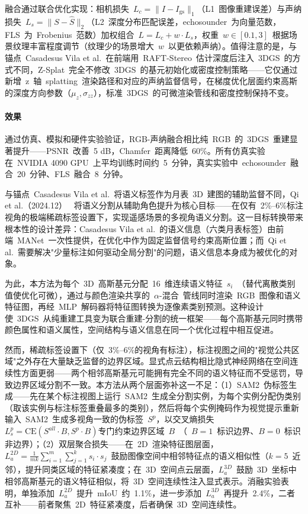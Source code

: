 融合通过联合优化实现：相机损失~$L_c = \|I - I_{\text{gs}}\|_1$（L1~图像重建误差）与声纳损失~$L_s = \|S - \hat{S}\|_2$（L2~深度分布匹配误差，echosounder~为向量范数，FLS~为~Frobenius~范数）加权组合~$L = L_c + w \cdot L_s$，权重~$w \in [0.1, 3]$~根据场景纹理丰富程度调节（纹理少的场景增大~$w$~以更依赖声纳）。值得注意的是，与锚点~Casadesus Vila et al.~在前端用~RAFT-Stereo~估计深度后注入~3DGS~的方式不同，Z-Splat~完全不修改~3DGS~的基元初始化或密度控制策略——它仅通过新增~z~轴~splatting~渲染路径和对应的声纳监督信号，在梯度优化层面约束高斯的深度方向参数（$\mu_z, \sigma_{zz}$），标准~3DGS~的可微渲染管线和密度控制保持不变。

\paragraph{效果}通过仿真、模拟和硬件实验验证，RGB-声纳融合相比纯~RGB~的~3DGS~重建显著提升——PSNR~改善~5 dB，Chamfer~距离降低~60\%。所有仿真实验在~NVIDIA 4090 GPU~上平均训练时间约~5~分钟，真实实验中~echosounder~融合~20~分钟、FLS~融合~8~分钟。

与锚点~Casadesus Vila et al.~将语义标签作为月表~3D~建图的辅助监督不同，Qi et al.（2024.12）~\cite{2412_05969} 将语义分割从辅助角色提升为核心目标——在仅有~2\%--6\%标注视角的极端稀疏标签设置下，实现遥感场景的多视角语义分割。这一目标转换带来根本性的设计差异：Casadesus Vila et al.~的语义信息（六类月表标签）由前端~MANet~一次性提供，在优化中作为固定监督信号约束高斯位置；而~Qi et al.~需要解决"少量标注如何驱动全局分割"的问题，语义信息本身成为被优化的对象。

为此，本方法为每个~3D~高斯基元分配~16~维连续语义特征~$s_i$~（替代离散类别值使优化可微），通过与颜色渲染共享的~$\alpha$-混合~管线同时渲染~RGB~图像和语义特征图，再经~MLP~解码器将特征图转换为逐像素类别预测。这种设计使~3DGS~从纯重建工具变为联合重建-分割的统一框架——每个高斯基元同时携带颜色属性和语义属性，空间结构与语义信息在同一个优化过程中相互促进。

然而，稀疏标签设置下（仅~3\%--6\%的视角有标注），标注视图之间的"视觉公共区域"之外存在大量缺乏监督的边界区域。显式点云结构相比隐式神经网络在空间连续性方面更弱——两个相邻高斯基元可能拥有完全不同的语义特征而不受惩罚，导致边界区域分割不一致。本方法从两个层面弥补这一不足：（1）SAM2~伪标签生成——先在某个标注视图上运行~SAM2~生成全分割实例，为每个实例分配伪类别（取该实例与标注标签重叠最多的类别），然后将每个实例掩码作为视觉提示重新输入~SAM2~生成多视角一致的伪标签~$S^p$，以交叉熵损失$L_s^p = \text{CE}(S^{all} \cdot B, S^p \cdot B)$专门约束边界区域~$B$~（~$B=1$~标识边界、$B=0$~标识非边界）；（2）双层聚合损失——在~2D~渲染特征图层面，$L_a^{2D} = \frac{1}{mk}\sum_{i=1}^{m}\sum_{j=1}^{k}s_i \cdot s_j$~鼓励图像空间中相邻特征点的语义相似性（$k=5$~近邻），提升同类区域的特征紧凑度；在~3D~空间点云层面，$L_a^{3D}$~鼓励~3D~坐标中相邻高斯基元的语义特征相似，将~3D~空间连续性注入显式表示。消融实验表明，单独添加~$L_a^{2D}$~提升~mIoU~约~1.1\%，进一步添加~$L_a^{3D}$~再提升~2.4\%，二者互补——前者聚焦~2D~特征紧凑度，后者确保~3D~空间连续性。

